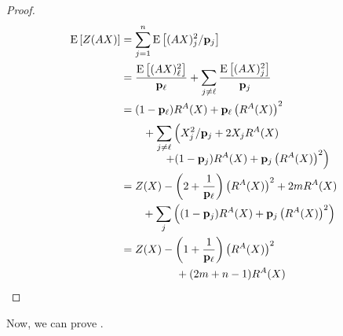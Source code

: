 \begin{proof}
	\begin{align*}
		\E{Z(AX)} 
		&= \sum_{j=1}^n \E{(AX)_j^2/\p_j} \\
		&= \frac{\E{(AX)_\ell^2}}{\p_\ell} + \sum_{j \neq \ell} \frac{\E{(AX)_j^2}}{\p_j} \\
		&= \begin{multlined}[t][6.25cm](1-\p_\ell)R^A(X) + \p_\ell\left(R^A(X)\right)^2 \\[0.75ex]
			\vspace*{-1.5ex}\shoveleft[0.25cm]{+ \sum_{j \neq \ell} \left( X_j^2/\p_j + 2X_jR^A(X)} \vphantom{\left(R^A(X)\right)^2}\right.\\
			\left.+ (1-\p_j)R^A(X) + \p_j\left(R^A(X)\right)^2 \right) \end{multlined} \\
		&= Z(X) - \left(2 + \frac{1}{\p_\ell}\right)\left(R^A(X)\right)^2 + 2mR^A(X) \\
		&\qquad+ \sum_j \left((1-\p_j)R^A(X) + \p_j\left(R^A(X)\right)^2\right) \\
		&= \begin{multlined}[t]Z(X) - \left(1+\frac{1}{\p_\ell}\right)\left(R^A(X)\right)^2 \\
			+ (2m+n-1)R^A(X) \end{multlined}
	\end{align*}
\end{proof}

Now, we can prove .

